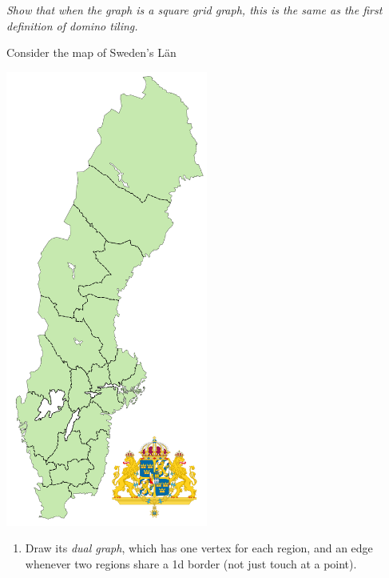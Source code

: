 \documentclass[11pt,fleqn]{book} %
\begin{document}
 \textit{Show that when the graph is a square grid graph, this is the same as the first definition of domino tiling.}

 \begin{problem}
Consider the map of Sweden's Län
\begin{center}
\includegraphics[height=15cm]{LanSverige.png}
\end{center}
\begin{enumerate}[label=\alph*.]
 \item Draw its \textit{dual graph}, which has one vertex for each region, and an edge whenever two regions share a 1d border (not just touch at a point).
\end{enumerate}
 \end{problem}
\end{document}
